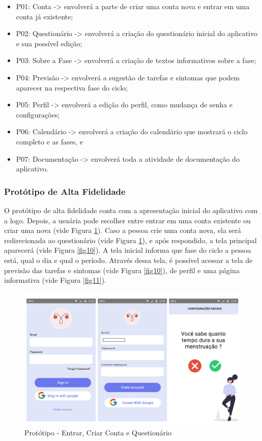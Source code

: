 \begin{itemize}
    \item P01: Conta -> envolverá a parte de criar uma conta nova e entrar em uma conta já existente;
    \item P02: Questionário -> envolverá a criação do questionário inicial do aplicativo e sua possível edição;
\item P03: Sobre a Fase -> envolverá a criação de textos informativos sobre a fase;
\item P04: Previsão -> envolverá a sugestão de tarefas e sintomas que podem aparecer na respectiva fase do ciclo;
\item P05: Perfil -> envolverá a edição do perfil, como mudança de senha e configurações;
\item P06: Calendário -> envolverá a criação do calendário que mostrará o ciclo completo e as fases, e
\item P07: Documentação -> envolverá toda a atividade de documentação do aplicativo.

\end{itemize}


\subsubsection{Protótipo de Alta Fidelidade}

O protótipo de alta fidelidade conta com a apresentação 
inicial do aplicativo com a logo. Depois, a usuária 
pode escolher entre entrar em uma conta existente ou criar 
uma nova (vide Figura \ref{fig09}). Caso a pessoa crie uma conta 
nova, ela será 
redirecionada ao questionário (vide Figura \ref{fig09}), e após 
respondido, a 
tela principal aparecerá (vide Figura \ref{fig10}). A tela inicial informa que 
fase do ciclo a pessoa está, qual o dia 
e qual o período. Através dessa tela, é possível acessar 
a tela de previsão das tarefas e sintomas (vide Figura \ref{fig10}), de perfil
e uma página informativa (vide Figura \ref{fig11}).

\begin{figure}[h]
	\centering
	\includegraphics[keepaspectratio=true,scale=0.4]{figuras/prototipo1.pdf}
	\caption{Protótipo - Entrar, Criar Conta e Questionário}
        \label{fig09}
\end{figure}


